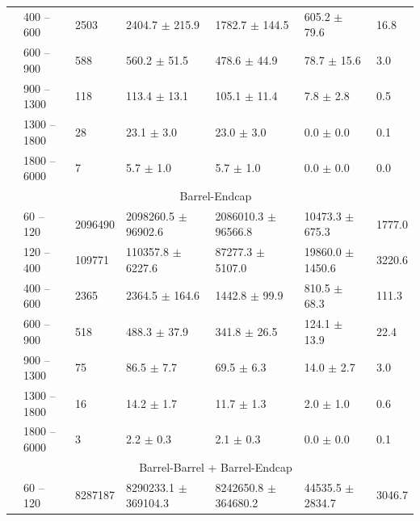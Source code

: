 \begin{table}[!htbp]
\begin{center}
{\begin{tabular}{|l|l|l|l|l|l|l|}
& 400   -- 600   & 2503           & 2404.7     $\pm$ 215.9      & 1782.7     $\pm$ 144.5            & 605.2      $\pm$ 79.6             & 16.8        \\
& 600   -- 900   & 588            & 560.2      $\pm$ 51.5       & 478.6      $\pm$ 44.9             & 78.7       $\pm$ 15.6             & 3.0         \\
& 900   -- 1300  & 118            & 113.4      $\pm$ 13.1       & 105.1      $\pm$ 11.4             & 7.8        $\pm$ 2.8              & 0.5         \\
& 1300  -- 1800  & 28             & 23.1       $\pm$ 3.0        & 23.0       $\pm$ 3.0              & 0.0        $\pm$ 0.0              & 0.1         \\
& 1800  -- 6000  & 7              & 5.7        $\pm$ 1.0        & 5.7        $\pm$ 1.0              & 0.0        $\pm$ 0.0              & 0.0         \\  \cline{2-7}
&\multicolumn{6}{c|}{Barrel-Endcap} \\ \cline{2-7}
& 60    -- 120   & 2096490        & 2098260.5  $\pm$ 96902.6    & 2086010.3  $\pm$ 96566.8          & 10473.3    $\pm$ 675.3            & 1777.0     \\
& 120   -- 400   & 109771         & 110357.8   $\pm$ 6227.6     & 87277.3    $\pm$ 5107.0           & 19860.0    $\pm$ 1450.6           & 3220.6     \\
& 400   -- 600   & 2365           & 2364.5     $\pm$ 164.6      & 1442.8     $\pm$ 99.9             & 810.5      $\pm$ 68.3             & 111.3      \\
& 600   -- 900   & 518            & 488.3      $\pm$ 37.9       & 341.8      $\pm$ 26.5             & 124.1      $\pm$ 13.9             & 22.4       \\
& 900   -- 1300  & 75             & 86.5       $\pm$ 7.7        & 69.5       $\pm$ 6.3              & 14.0       $\pm$ 2.7              & 3.0        \\
& 1300  -- 1800  & 16             & 14.2       $\pm$ 1.7        & 11.7       $\pm$ 1.3              & 2.0        $\pm$ 1.0              & 0.6        \\
& 1800  -- 6000  & 3              & 2.2        $\pm$ 0.3        & 2.1        $\pm$ 0.3              & 0.0        $\pm$ 0.0              & 0.1        \\  \cline{2-7}
&\multicolumn{6}{c|}{Barrel-Barrel + Barrel-Endcap} \\ \cline{2-7}
& 60    -- 120   & 8287187        & 8290233.1  $\pm$ 369104.3   & 8242650.8  $\pm$ 364680.2         & 44535.5    $\pm$ 2834.7           & 3046.7    \\

\end{tabular}}
\end{center}
\end{table}
